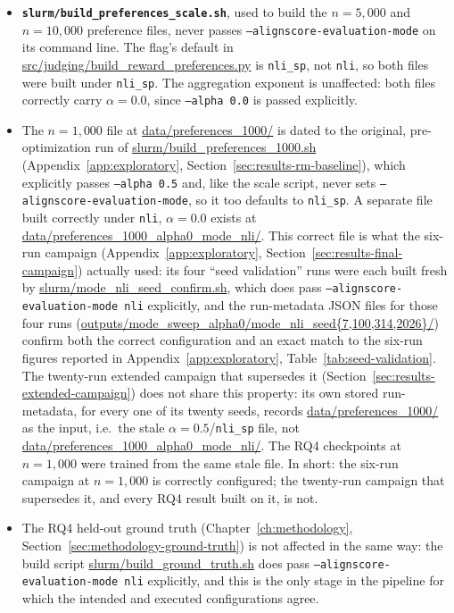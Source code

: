 \begin{itemize}
  \item \textbf{\texttt{slurm/build\_preferences\_scale.sh}}, used to build
    the $n=5{,}000$ and $n=10{,}000$ preference files, never passes
    \texttt{--alignscore-evaluation-mode} on its command line. The flag's
    default in \url{src/judging/build_reward_preferences.py} is
    \texttt{nli\_sp}, not \texttt{nli}, so both files were built under
    \texttt{nli\_sp}. The aggregation exponent is unaffected: both files
    correctly carry $\alpha = 0.0$, since \texttt{--alpha 0.0} is passed
    explicitly.
  \item The $n=1{,}000$ file at \url{data/preferences_1000/} is dated to
    the original, pre-optimization run of
    \url{slurm/build_preferences_1000.sh}
    (Appendix~\ref{app:exploratory},
    Section~\ref{sec:results-rm-baseline}), which explicitly passes
    \texttt{--alpha 0.5} and, like the scale script, never sets
    \texttt{--alignscore-evaluation-mode}, so it too defaults to
    \texttt{nli\_sp}. A separate file built correctly under \texttt{nli},
    $\alpha=0.0$ exists at
    \url{data/preferences_1000_alpha0_mode_nli/}. This correct file is what
    the six-run campaign (Appendix~\ref{app:exploratory},
    Section~\ref{sec:results-final-campaign}) actually
    used: its four ``seed validation'' runs were each built fresh by
    \url{slurm/mode_nli_seed_confirm.sh}, which does pass
    \texttt{--alignscore-evaluation-mode nli} explicitly, and the run-metadata
    JSON files for those four runs
    (\url{outputs/mode_sweep_alpha0/mode_nli_seed\{7,100,314,2026\}/}) confirm
    both the correct configuration and an exact match to the six-run
    figures reported in Appendix~\ref{app:exploratory},
    Table~\ref{tab:seed-validation}. The twenty-run
    extended campaign that supersedes it
    (Section~\ref{sec:results-extended-campaign}) does not share this
    property: its own stored run-metadata, for every one of its twenty
    seeds, records \url{data/preferences_1000/} as the input, i.e.\ the
    stale $\alpha=0.5$/\texttt{nli\_sp} file, not
    \url{data/preferences_1000_alpha0_mode_nli/}. The RQ4 checkpoints at
    $n=1{,}000$ were trained from the same stale file. In short: the
    six-run campaign at $n=1{,}000$ is correctly configured; the twenty-run
    campaign that supersedes it, and every RQ4 result built on it, is not.
  \item The RQ4 held-out ground truth (Chapter~\ref{ch:methodology},
    Section~\ref{sec:methodology-ground-truth}) is not affected in the same
    way: the build script
    \url{slurm/build_ground_truth.sh} does pass
    \texttt{--alignscore-evaluation-mode nli} explicitly, and this is the
    only stage in the pipeline for which the intended and executed
    configurations agree.
\end{itemize}

